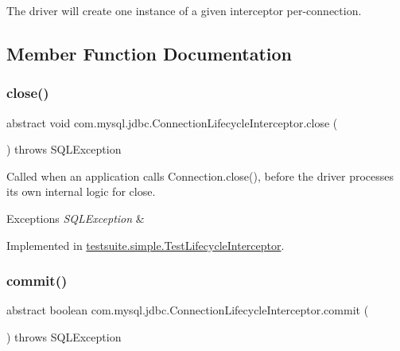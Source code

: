 The driver will create one instance of a given interceptor per-\/connection. 

\subsection{Member Function Documentation}
\mbox{\label{interfacecom_1_1mysql_1_1jdbc_1_1_connection_lifecycle_interceptor_a73675852c009a064292c1ae98d7caeb7}} 
\subsubsection{\texorpdfstring{close()}{close()}}
{\footnotesize\ttfamily abstract void com.\+mysql.\+jdbc.\+Connection\+Lifecycle\+Interceptor.\+close (\begin{DoxyParamCaption}{ }\end{DoxyParamCaption}) throws S\+Q\+L\+Exception\hspace{0.3cm}{\ttfamily [abstract]}}

Called when an application calls Connection.\+close(), before the driver processes its own internal logic for close.


\begin{DoxyExceptions}{Exceptions}
{\em S\+Q\+L\+Exception} & \\
\hline
\end{DoxyExceptions}


Implemented in \mbox{\hyperlink{classtestsuite_1_1simple_1_1_test_lifecycle_interceptor_ace03032cbe6f9aae94a05ae442466d2d}{testsuite.\+simple.\+Test\+Lifecycle\+Interceptor}}.

\mbox{\label{interfacecom_1_1mysql_1_1jdbc_1_1_connection_lifecycle_interceptor_ac8f559b2bf353ede24b6845d5edeeeb0}} 
\subsubsection{\texorpdfstring{commit()}{commit()}}
{\footnotesize\ttfamily abstract boolean com.\+mysql.\+jdbc.\+Connection\+Lifecycle\+Interceptor.\+commit (\begin{DoxyParamCaption}{ }\end{DoxyParamCaption}) throws S\+Q\+L\+Exception\hspace{0.3cm}{\ttfamily [abstract]}}

